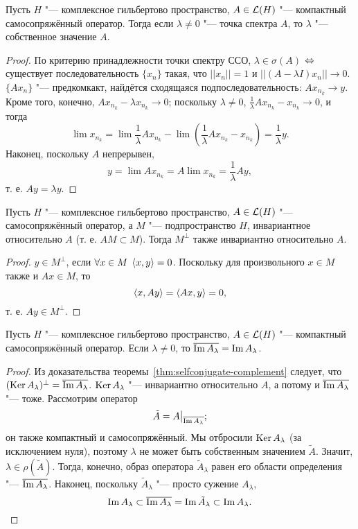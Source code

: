 \documentclass[main]{subfiles}
\begin{document}
\begin{lemma}
  Пусть \( H \) "--- комплексное гильбертово пространство,
  \( A \in \Linears{H} \) "--- компактный самосопряжённый оператор.
  Тогда если \( \lambda \ne 0 \) "--- точка спектра \( A \),
  то \( \lambda \) "--- собственное значение \( A \).
\end{lemma}
\begin{proof}
  По критерию принадлежности точки спектру ССО,
  \( \lambda \in \sigma(A) \) \(\Leftrightarrow\) 
  существует последовательность \( \{ x_n \} \)
  такая, что \( ||x_n|| = 1 \) и
  \( ||(A - \lambda I) x_n|| \to 0 \).
  \( \{ A x_n \} \) "--- предкомкакт,
  найдётся сходящаяся подпоследовательность:
  \( A x_{n_k} \to y \).
  Кроме того, конечно,
  \( A x_{n_k} - \lambda x_{n_k} \to 0 \);
  поскольку \( \lambda \ne 0 \),
  \( \frac1\lambda A x_{n_k} - x_{n_k} \to 0 \),
  и тогда
  \[
    \lim x_{n_k} = \lim \frac1\lambda A x_{n_k} - \lim (\frac1\lambda A x_{n_k} - x_{n_k}) =
    \frac1\lambda y.
  \]
  Наконец, поскольку \( A \) непрерывен,
  \[
    y = \lim A x_{n_k} = A \lim x_{n_k} = \frac1\lambda A y,
  \]
  т. е. \( A y = \lambda y \).
\end{proof}

\begin{lemma}%
  Пусть \( H \) "--- комплексное гильбертово пространство,
  \( A \in \Linears{H} \) "--- самосопряжённый оператор,
  а \( M \) "--- подпространство \( H \),
  инвариантное относительно \( A \)
  (т. е. \( AM \subset M \)).
  Тогда \( M^\perp \) также инвариантно
  относительно \( A \).
\end{lemma}
\begin{proof}
  \( y \in M^\perp \), если \( \forall {x \in M} \; \,
  \langle x, y \rangle = 0 \).
  Поскольку для произвольного \( x \in M \)
  также и \( Ax \in M \), то
  \[
    \langle x, Ay \rangle = \langle Ax, y \rangle = 0,
  \]
  т. е. \( Ay \in M^\perp \).
\end{proof}

\begin{lemma}%
  Пусть \( H \) "--- комплексное гильбертово пространство,
  \( A \in \Linears{H} \) "--- компактный самосопряжённый оператор.
  Если \( \lambda \ne 0 \),
  то \( \overline{\operatorname{Im} A_\lambda} = \operatorname{Im} A_\lambda \).
\end{lemma}
\begin{proof}
  Из доказательства теоремы~\ref{thm:selfconjugate-complement}
  следует, что \( (\operatorname{Ker} A_\lambda)^\perp = \overline{\operatorname{Im} A_\lambda} \).
  \( \operatorname{Ker} A_\lambda \) "--- инвариантно относительно \( A \),
  а потому и \( \overline{\operatorname{Im} A_\lambda} \) "--- тоже.
  Рассмотрим оператор
  \[ \tilde A = A \bigr|_{\overline{\operatorname{Im} A_\lambda}};\]
  он также компактный и самосопряжённый.
  Мы отбросили
  \( \operatorname{Ker} A_\lambda \) (за исключением нуля),
  поэтому  \( \lambda \)
  не может быть собственным значением \( \tilde A \).
  Значит, \( \lambda \in \rho(\tilde A) \).
  Тогда, конечно, образ оператора \( \tilde A_\lambda \) равен
  его области определения "--- \( \overline{\operatorname{Im} A_\lambda} \).
  Наконец, поскольку \( \tilde A_\lambda \) "--- просто сужение \( A_\lambda \),
  \[
    \operatorname{Im} A_\lambda \subset
    \overline{\operatorname{Im} A_\lambda} =
    \operatorname{Im} \tilde A_\lambda \subset
    \operatorname{Im} A_\lambda. \qedhere
  \]
\end{proof}
\end{document}
